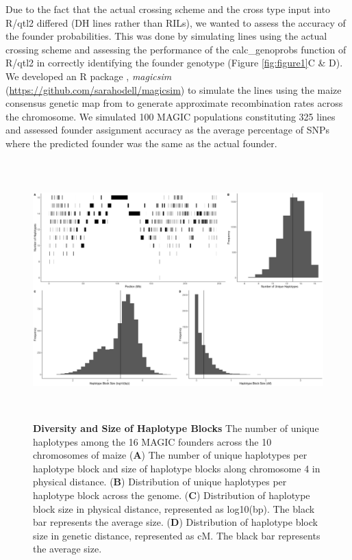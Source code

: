\documentclass[article,9pt,twocolumn,twoside]{rilabRxiv}
\begin{document}
Due to the fact that the actual crossing scheme and the cross type input into R/qtl2 differed (DH lines rather than RILs), we wanted to assess the accuracy of the founder probabilities.
This was done by simulating lines using the actual crossing scheme and assessing the performance of the calc\_genoprobs function of R/qtl2 in correctly identifying the founder genotype (Figure \ref{fig:figure1}C \& D).
We developed an R package \citep{R}, \emph{magicsim} (\url{https://github.com/sarahodell/magicsim}) to simulate the lines using the maize consensus genetic map from \citep{Ogut} to generate approximate recombination rates across the chromosome.
We simulated 100 MAGIC populations constituting 325 lines and assessed founder assignment accuracy as the average percentage of SNPs where the predicted founder was the same as the actual founder.



\begin{figure}[ht]
\includegraphics[width=\textwidth,height=10cm]{figures/figure2.png}
\caption{\textbf{Diversity and Size of Haplotype Blocks} The number of unique haplotypes among the 16 MAGIC founders across the 10 chromosomes of maize (\textbf{A}) The number of unique haplotypes per haplotype block and size of haplotype blocks along chromosome 4 in physical distance. (\textbf{B}) Distribution of unique haplotypes per haplotype block across the genome. (\textbf{C}) Distribution of haplotype block size in physical distance, represented as log10(bp). The black bar represents the average size. (\textbf{D}) Distribution of haplotype block size in genetic distance, represented as cM. The black bar represents the average size.}
\label{fig:figure2}
\end{figure}
\end{document}
